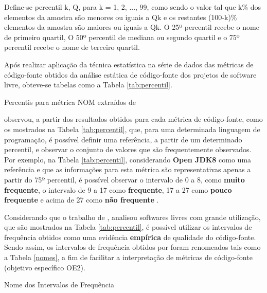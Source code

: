 Define-se percentil k, Q, para k = 1, 2, ..., 99, como sendo o valor tal que k\% dos elementos da amostra são menores ou iguais a Qk e os restantes (100-k)\% elementos da amostra são maiores ou iguais a Qk. O 25º percentil  recebe o nome de primeiro quartil, O 50º percentil de mediana ou segundo quartil e o 75º percentil recebe o nome de terceiro quartil.

Após realizar aplicação da técnica estatística na série de dados das métricas de código-fonte obtidos da análise estática de código-fonte dos projetos de software livre, obteve-se tabelas como a Tabela \ref{tab:percentil}.


	\begin{table}[!ht]
	\begin{center}
	
	 
	\caption{Percentis para métrica NOM extraídos de  
	}
	\label{tab:percentil}
	\end{center}
	\end{table}	
	\FloatBarrier	



 observou, a partir dos resultados obtidos para cada métrica de código-fonte, como os mostrados na Tabela \ref{tab:percentil}, que, para uma determinada linguagem de programação, é possível definir uma referência, a partir de um determinado percentil, e observar o conjunto de valores que são frequentemente observados. Por exemplo, na Tabela \ref{tab:percentil}, considerando \textbf{Open JDK8} como uma referência e que as informações para esta métrica são representativas apenas a partir do 75º percentil, é possível observar o intervalo de 0 a 8, como \textbf{muito frequente}, o intervalo de 9 a 17 como \textbf{frequente}, 17 a 27 como \textbf{pouco frequente} e acima de 27 como \textbf{não frequente} \cite{Meirelles2013}.  


Considerando que o trabalho de , analisou softwares livres com grande utilização, que são mostrados na Tabela \ref{tab:percentil}, é possível utilizar os intervalos de frequência obtidos como uma evidência \textbf{empírica} de qualidade do código-fonte. Sendo assim, os intervalos de frequência obtidos por  foram renomeados tais como a Tabela \ref{nomes}, a fim de facilitar a interpretação de métricas de código-fonte (objetivo específico OE2). 

	\begin{table}[!ht]
	\begin{center}
	
	\caption{Nome dos Intervalos de Frequência}
	\label{nomes}
	\end{center}
	\end{table}
		
